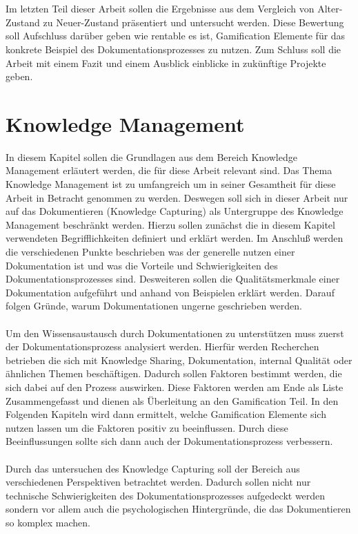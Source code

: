 \documentclass[a4paper,12pt]{scrartcl}
\begin{document}
\\\\
Im letzten Teil dieser Arbeit sollen die Ergebnisse aus dem Vergleich von Alter-Zustand zu Neuer-Zustand präsentiert und untersucht werden. Diese Bewertung soll Aufschluss darüber geben wie rentable es ist, Gamification Elemente für das konkrete Beispiel des Dokumentationsprozesses zu nutzen. Zum Schluss soll die Arbeit mit einem Fazit und einem Ausblick einblicke in zukünftige Projekte geben.

\section{Knowledge Management}
In diesem Kapitel sollen die Grundlagen aus dem Bereich Knowledge Management erläutert werden, die für diese Arbeit relevant sind. Das Thema Knowledge Management ist zu umfangreich um in seiner Gesamtheit für diese Arbeit in Betracht genommen zu werden. Deswegen soll sich in dieser Arbeit nur auf das Dokumentieren (Knowledge Capturing) als Untergruppe des Knowledge Management beschränkt werden. Hierzu sollen zunächst die in diesem Kapitel verwendeten Begrifflichkeiten definiert und erklärt werden. Im Anschluß werden die verschiedenen Punkte beschrieben was der generelle nutzen einer Dokumentation ist und was die Vorteile und Schwierigkeiten des Dokumentationsprozesses sind. Desweiteren sollen die Qualitätsmerkmale einer Dokumentation aufgeführt und anhand von Beispielen erklärt werden. Darauf folgen Gründe, warum Dokumentationen ungerne geschrieben werden.
\\\\
Um den Wissensaustausch durch Dokumentationen zu unterstützen muss zuerst der Dokumentationsprozess analysiert werden. Hierfür werden Recherchen betrieben die sich mit Knowledge Sharing, Dokumentation, internal Qualität oder ähnlichen Themen beschäftigen. Dadurch sollen Faktoren bestimmt werden, die sich dabei auf den Prozess auswirken. Diese Faktoren werden am Ende als Liste Zusammengefasst und dienen als Überleitung an den Gamification Teil. In den Folgenden Kapiteln wird dann ermittelt, welche Gamification Elemente sich nutzen lassen um die Faktoren positiv zu beeinflussen. Durch diese Beeinflussungen sollte sich dann auch der Dokumentationsprozess verbessern.
\\\\
Durch das untersuchen des Knowledge Capturing soll der Bereich aus verschiedenen Perspektiven betrachtet werden. Dadurch sollen nicht nur technische Schwierigkeiten des Dokumentationsprozesses aufgedeckt werden sondern vor allem auch die psychologischen Hintergründe, die das Dokumentieren so komplex machen.
\end{document}
